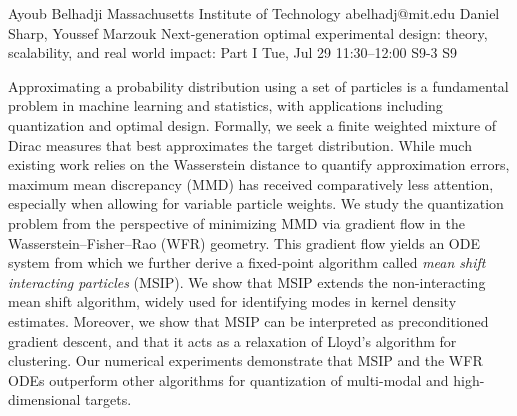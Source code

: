 \begin{talk}
  {Ayoub Belhadji}%
  {Massachusetts Institute of Technology}%
  {abelhadj@mit.edu}%
  {Daniel Sharp, Youssef Marzouk}%
  {Next-generation optimal experimental design: theory, scalability, and real world impact: Part I}%
  {}%
  {Tue, Jul 29 11:30–12:00}%
  {S9-3}%
  {S9}%
				
			
Approximating a probability distribution using a set of particles is a fundamental problem in machine learning and statistics, with applications including  quantization and optimal design. Formally, we seek a finite weighted mixture of Dirac measures that best approximates the target distribution. While much existing work relies on the Wasserstein distance to quantify approximation errors, maximum mean discrepancy (MMD) has received comparatively less attention, especially when allowing for variable particle weights. We study the quantization problem from the perspective of minimizing MMD via gradient flow in the Wasserstein--Fisher--Rao (WFR) geometry. This gradient flow yields an ODE system from which we further derive a fixed-point algorithm called \emph{mean shift interacting particles} (MSIP). We show that MSIP extends the non-interacting mean shift algorithm, widely used for identifying modes in kernel density estimates. Moreover, we show that MSIP can be interpreted as preconditioned gradient descent, and that it acts as a relaxation of Lloyd's algorithm for clustering. 
Our numerical experiments demonstrate that MSIP and the WFR ODEs outperform other algorithms for quantization of multi-modal and high-dimensional targets.
\medskip


\end{talk}

